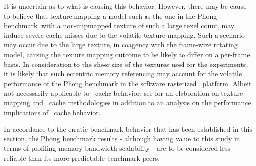 It is uncertain as to what is causing this behavior.
However, there may be cause to believe that texture mapping a model such as the one in the Phong benchmark, with a non-mipmapped texture of such a large texel count, may induce severe cache-misses due to the volatile texture mapping.
Such a scenario may occur due to the large texture, in coagency with the frame-wize rotating model, causing the texture mapping outcome to be likely to differ on a per-frame basis.
In consideration to the sheer size of the textures used for the experiments, it is likely that such eccentric memory referencing may account for the volatile performance of the Phong benchmark in the software rasterized \dvttermsimics\ platform.
Albeit not necessarily applicable to \dvttermcpu\ cache behavior; see  for an elaboration on texture mapping and \dvttermgpu\ cache methodologies in addition to an analysis on the performance implications of \dvttermgpu\ cache behavior.

In accordance to the erratic benchmark behavior that has been established in this section, the Phong benchmark results - although having value to this study in terms of profiling memory bandwidth scalability - are to be considered less reliable than its more predictable benchmark peers.


